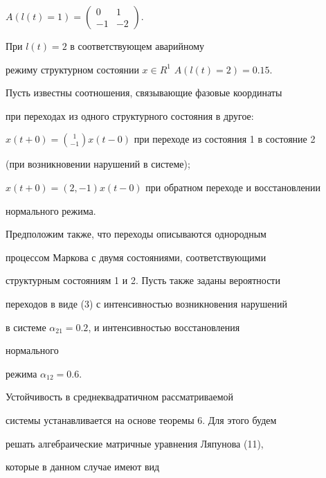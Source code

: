 $A(l(t)=1)= 


\left(\begin{smallmatrix}0 & 1 \\ -1 & -2\end{smallmatrix}\right)$. 


При $l(t)=2$ в соответствующем аварийному 


режиму структурном состоянии $x\in R^1$\; $A(l(t)=2)=0.15$. 


Пусть известны соотношения, связывающие фазовые координаты 


при переходах из одного структурного состояния в другое: 


$x(t+0)=\binom{1}{-1}x(t-0)$ при переходе из состояния 1 в состояние 2 


(при возникновении нарушений в системе); 


$x(t+0)=(2,-1)x(t-0)$ при обратном переходе и восстановлении  


нормального режима.  


 


Предположим также, что переходы описываются однородным 


процессом Маркова с двумя состояниями, соответствующими  


структурным состояниям 1 и 2. Пусть также заданы вероятности  


переходов в виде (3) с интенсивностью возникновения нарушений 


в системе $\alpha_{21}=0.2$, и интенсивностью восстановления 


нормального 


режима $\alpha_{12}=0.6$. 


 


Устойчивость в среднеквадратичном рассматриваемой 


системы устанавливается на основе теоремы 6. Для этого будем 


решать алгебраические матричные уравнения Ляпунова (11), 


которые в данном случае имеют вид  


